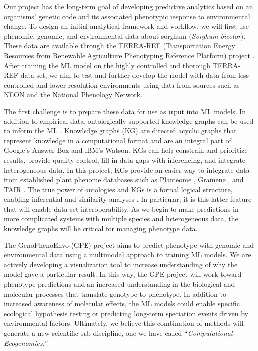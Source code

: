 \documentclass[12pt,]{article}
\begin{document}
Our project has the long-term goal of developing predictive analytics
based on an organisms' genetic code and its associated phenotypic
response to environmental change. To design an initial analytical
framework and workflow, we will first use phenomic, genomic, and
environmental data about sorghum (\emph{Sorghum bicolor}). These data
are available through the TERRA-REF (Transportation Energy Resources
from Renewable Agriculture Phenotyping Reference Platform) project
\citep{lebauer2020data, burnette2018terra}. After training the ML model
on the highly controlled and thorough TERRA-REF data set, we aim to test
and further develop the model with data from less controlled and lower
resolution environments using data from sources such as NEON and the
National Phenology Network.

The first challenge is to prepare these data for use as input into ML
models. In addition to empirical data, ontologically-supported knowledge
graphs can be used to inform the ML \citep{mungall2017monarch}.
Knowledge graphs (KG) are directed acyclic graphs that represent
knowledge in a computational format and are an integral part of Google's
Answer Box and IBM's Watson. KGs can help constrain and prioritize
results, provide quality control, fill in data gaps with inferencing,
and integrate heterogeneous data. In this project, KGs provide an easier
way to integrate data from established plant phenome databases such as
Planteome \citep{cooper2018planteome}, Gramene
\citep{jaiswal_gramene_2011}, and TAIR \citep{poole_tair_2007}. The true
power of ontologies and KGs is a formal logical structure, enabling
inferential and similarity analyses
\citep{mungall2017monarch, washington2009linking}. In particular, it is
this latter feature that will enable data set interoperability. As we
begin to make predictions in more complicated systems with multiple
species and heterogeneous data, the knowledge graphs will be critical
for managing phenotype data.

The GenoPhenoEnvo (GPE) project aims to predict phenotype with genomic
and environmental data using a multimodal approach to training ML
models. We are actively developing a visualization tool to increase
understanding of why the model gave a particular result. In this way,
the GPE project will work toward phenotype predictions and an increased
understanding in the biological and molecular processes that translate
genotype to phenotype. In addition to increased awareness of molecular
effects, the ML models could enable specific ecological hypothesis
testing or predicting long-term speciation events driven by
environmental factors. Ultimately, we believe this combination of
methods will generate a new scientific sub-discipline, one we have
called ``\emph{Computational Ecogenomics.}''
\end{document}
